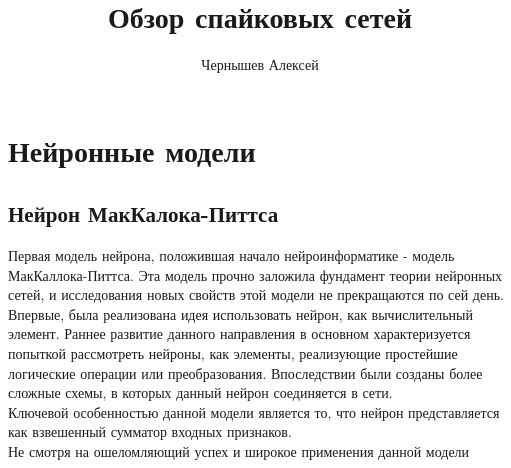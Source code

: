 \documentclass[a4paper,10pt]{article}
\title{Обзор спайковых сетей}
\author{Чернышев Алексей}
\begin{document}


\tableofcontents
\clearpage
\section{Нейронные модели}
	
	
\subsection{Нейрон МакКалока-Питтса}
   Первая модель нейрона, положившая начало нейроинформатике  - модель МакКаллока-Питтса. Эта модель прочно заложила фундамент теории нейронных сетей, и исследования новых свойств этой модели не   прекращаются по сей день.\\
   \indent Впервые, была реализована идея использовать нейрон, как вычислительный элемент. Раннее развитие данного направления в основном характеризуется попыткой рассмотреть нейроны, как элементы,        реализующие простейшие логические операции или преобразования. Впоследствии были созданы более сложные схемы, в которых данный нейрон соединяется в сети.\\
   \indent Ключевой особенностью данной модели является то, что нейрон представляется как взвешенный сумматор входных признаков.\\
   \indent Не смотря на ошеломляющий успех и широкое применения данной модели 
\end{document}
